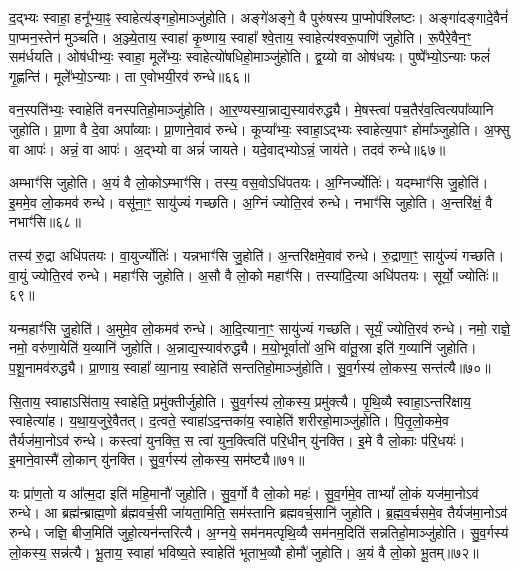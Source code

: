 द॒द्भ्यः स्वाहा॒ हनू᳚भ्या॒ꣴ॒ स्वाहेत्य॑ङ्गहो॒माञ्जु॑होति।
अङ्गे॑अङ्गे॒ वै पुरु॑षस्य पा॒प्मोप॑श्लिष्टः।
अङ्गा॑दङ्गादे॒वैनं॑ पा॒प्मन॒स्तेन॑ मुञ्चति।
अ॒ञ्ज्ये॒ताय॒ स्वाहा॑ कृ॒ष्णाय॒ स्वाहा᳚ श्वे॒ताय॒ स्वाहेत्य॑श्वरू॒पाणि॑ जुहोति।
रू॒पैरे॒वैन॒ꣳ॒ सम॑र्धयति।
ओष॑धीभ्यः॒ स्वाहा॒ मूले᳚भ्यः॒ स्वाहेत्यो॑षधिहो॒माञ्जु॑होति।
द्व॒य्यो वा ओष॑धयः।
पुष्पे᳚भ्यो॒\-ऽन्याः फलं॑ गृ॒ह्णन्ति॑।
मूले᳚भ्यो॒\-ऽन्याः।
ता ए॒वोभयी॒रव॑ रुन्धे॥६६॥

वन॒स्पति॑भ्यः॒ स्वाहेति॑ वनस्पतिहो॒माञ्जु॑होति।
आ॒र॒ण्यस्या॒न्नाद्य॒स्याव॑रुद्ध्यै।
मे॒षस्त्वा॑ पच॒तैर॑व॒त्वित्यपा᳚व्यानि जुहोति।
प्रा॒णा वै दे॒वा अपा᳚व्याः।
प्रा॒णाने॒वाव॑ रुन्धे।
कूप्या᳚भ्यः॒ स्वाहा॒ऽद्भ्यः स्वाहेत्य॒पाꣳ होमा᳚ञ्जुहोति।
अ॒फ्सु वा आपः॑।
अन्नं॒ वा आपः॑।
अ॒द्भ्यो वा अन्नं॑ जायते।
यदे॒वाद्भ्यो\-ऽन्नं॒ जाय॑ते।
तदव॑ रुन्धे॥६७॥\anuvakamend[पू॒र्व॒दी॒क्षा जु॑होति॒ पूर्व॑ ए॒व द्वि॒षन्तं॒ भ्रातृ॑व्य॒मति॑ क्राम॒त्यन॑न्तरित्यै क्रामति रुन्धे॒ जाय॑त॒ एकं॑ च]

अम्भाꣳ॑सि जुहोति।
अ॒यं वै लो॒को\-ऽम्भाꣳ॑सि।
तस्य॒ वस॒वो\-ऽधि॑पतयः।
अ॒ग्निर्ज्योतिः॑।
यदम्भाꣳ॑सि जु॒होति॑।
इ॒ममे॒व लो॒कमव॑ रुन्धे।
वसू॑ना॒ꣳ॒ सायु॑ज्यं गच्छति।
अ॒ग्निं ज्योति॒रव॑ रुन्धे।
नभाꣳ॑सि जुहोति।
अ॒न्तरि॑क्षं॒ वै नभाꣳ॑सि॥६८॥

तस्य॑ रु॒द्रा अधि॑पतयः।
वा॒युर्ज्योतिः॑।
यन्नभाꣳ॑सि जु॒होति॑।
अ॒न्तरि॑क्षमे॒वाव॑ रुन्धे।
रु॒द्राणा॒ꣳ॒ सायु॑ज्यं गच्छति।
वा॒युं ज्योति॒रव॑ रुन्धे।
महाꣳ॑सि जुहोति।
अ॒सौ वै लो॒को महाꣳ॑सि।
तस्या॑दि॒त्या अधि॑पतयः।
सूर्यो॒ ज्योतिः॑॥६९॥

यन्महाꣳ॑सि जु॒होति॑।
अ॒मुमे॒व लो॒कमव॑ रुन्धे।
आ॒दि॒त्याना॒ꣳ॒ सायु॑ज्यं गच्छति।
सूर्यं॒ ज्योति॒रव॑ रुन्धे।
नमो॒ राज्ञे॒ नमो॒ वरु॑णा॒येति॑ य॒व्यानि॑ जुहोति।
अ॒न्नाद्य॒स्याव॑रुद्ध्यै।
म॒यो॒भूर्वातो॑ अ॒भि वा॑तू॒स्रा इति॑ ग॒व्यानि॑ जुहोति।
प॒शू॒नामव॑रुद्ध्यै।
प्रा॒णाय॒ स्वाहा᳚ व्या॒नाय॒ स्वाहेति॑ सन्ततिहो॒माञ्जु॑होति।
सु॒व॒र्गस्य॑ लो॒कस्य॒ सन्त॑त्यै॥७०॥

सि॒ताय॒ स्वाहा\-ऽसि॑ताय॒ स्वाहेति॒ प्रमु॑क्तीर्जुहोति।
सु॒व॒र्गस्य॑ लो॒कस्य॒ प्रमु॑क्त्यै।
पृ॒थि॒व्यै स्वाहा॒\-ऽन्तरि॑क्षाय॒ स्वाहेत्या॑ह।
य॒था॒य॒जुरे॒वैतत्।
द॒त्वते॒ स्वाहा॑\-ऽद॒न्तका॑य॒ स्वाहेति॑ शरीरहो॒माञ्जु॑होति।
पि॒तृ॒लो॒कमे॒व तैर्यज॑मा॒नोऽव॑ रुन्धे।
कस्त्वा॑ युनक्ति॒ स त्वा॑ युन॒क्त्विति॑ परि॒धीन् यु॑नक्ति।
इ॒मे वै लो॒काः प॑रि॒धयः॑।
इ॒माने॒वास्मै॑ लो॒कान् यु॑नक्ति।
सु॒व॒र्गस्य॑ लो॒कस्य॒ सम॑ष्ट्यै॥७१॥

यः प्रा॑ण॒तो य आ᳚त्म॒दा इति॑ महि॒मानौ॑ जुहोति।
सु॒व॒र्गो वै लो॒को महः॑।
सु॒व॒र्गमे॒व ताभ्यां᳚ लो॒कं यज॑मा॒नोऽव॑ रुन्धे।
आ ब्रह्म॑न्ब्राह्म॒णो ब्र॑ह्मवर्च॒सी जा॑यता॒मिति॒ सम॑स्तानि ब्रह्मवर्च॒सानि॑ जुहोति।
ब्र॒ह्म॒व॒र्चसमे॒व तैर्यज॑मा॒नोऽव॑ रुन्धे।
जज्ञि॒ बीज॒मिति॑ जुहो॒त्यन॑न्तरित्यै।
अ॒ग्नये॒ सम॑नमत्पृथि॒व्यै सम॑नम॒दिति॑ सन्नतिहो॒माञ्जु॑होति।
सु॒व॒र्गस्य॑ लो॒कस्य॒ सन्न॑त्यै।
भू॒ताय॒ स्वाहा॑ भविष्य॒ते स्वाहेति॑ भूताभ॒व्यौ होमौ॑ जुहोति।
अ॒यं वै लो॒को भू॒तम्॥७२॥

